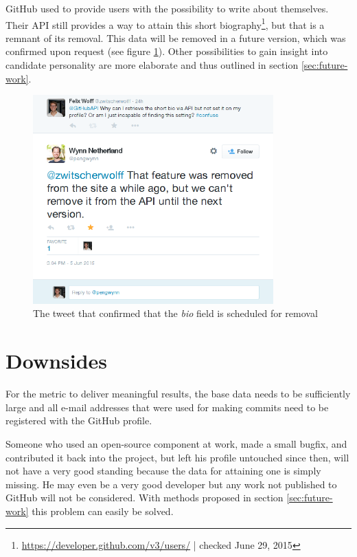 GitHub used to provide users with the possibility to write about themselves. Their API still provides a way to attain this short biography\footnote{\url{https://developer.github.com/v3/users/} | checked June 29, 2015}, but that is a remnant of its removal. This data will be removed in a future version, which was confirmed upon request (see figure \ref{fig:gapitweet}). Other possibilities to gain insight into candidate personality are more elaborate and thus outlined in section \ref{sec:future-work}.

\begin{figure}
  \centering
  \includegraphics[width=25em]{gfx/githubapi_tweet.png}
  \caption{The tweet that confirmed that the \textit{bio} field is scheduled for removal}
  \label{fig:gapitweet}
\end{figure}

\section{Downsides}\label{sec:threatstovalidity}
For the metric to deliver meaningful results, the base data needs to be sufficiently large and all e-mail addresses that were used for making commits need to be registered with the GitHub profile.

Someone who used an open-source component at work, made a small bugfix, and contributed it back into the project, but left his profile untouched since then, will not have a very good standing because the data for attaining one is simply missing. He may even be a very good developer but any work not published to GitHub will not be considered. With methods proposed in section \ref{sec:future-work} this problem can easily be solved.